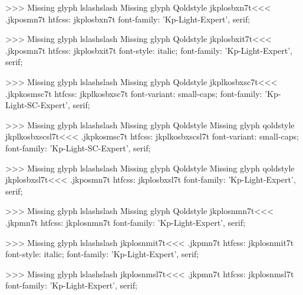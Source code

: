 >>>
Missing glyph	lslashslash
Missing glyph	Qoldstyle
\<jkplosbxn7t\><<<
.jkposmn7t
htfcss:  jkplosbxn7t  font-family: 'Kp-Light-Expert', serif;

>>>
Missing glyph	lslashslash
Missing glyph	Qoldstyle
\<jkplosbxit7t\><<<
.jkposmn7t
htfcss:  jkplosbxit7t  font-style: italic; font-family: 'Kp-Light-Expert', serif;

>>>
Missing glyph	lslashslash
Missing glyph	Qoldstyle
\<jkplkosbxsc7t\><<<
.jkpkosmsc7t
htfcss:  jkplkosbxsc7t  font-variant: small-caps; font-family: 'Kp-Light-SC-Expert', serif;

>>>
Missing glyph	lslashslash
Missing glyph	Qoldstyle
Missing glyph	qoldstyle
\<jkplkosbxscsl7t\><<<
.jkpkosmsc7t
htfcss:  jkplkosbxscsl7t  font-variant: small-caps; font-family: 'Kp-Light-SC-Expert', serif;

>>>
Missing glyph	lslashslash
Missing glyph	Qoldstyle
Missing glyph	qoldstyle
\<jkplosbxsl7t\><<<
.jkposmn7t
htfcss:  jkplosbxsl7t  font-family: 'Kp-Light-Expert', serif;

>>>
Missing glyph	lslashslash
Missing glyph	Qoldstyle
\<jkplosnmn7t\><<<
.jkpmn7t
htfcss:  jkplosnmn7t  font-family: 'Kp-Light-Expert', serif;

>>>
Missing glyph	lslashslash
\<jkplosnmit7t\><<<
.jkpmn7t
htfcss:  jkplosnmit7t  font-style: italic; font-family: 'Kp-Light-Expert', serif;

>>>
Missing glyph	lslashslash
\<jkplosnmsl7t\><<<
.jkpmn7t
htfcss:  jkplosnmsl7t  font-family: 'Kp-Light-Expert', serif;

